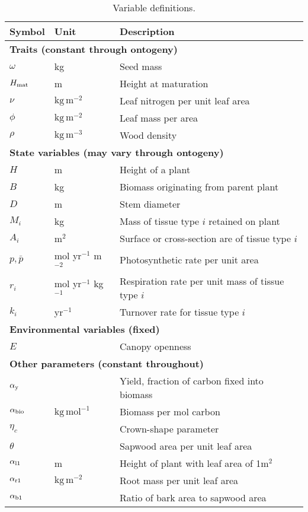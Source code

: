 \documentclass[9pt,twocolumn,twoside]{pnas-new}
\begin{document}
\begin{table}[!hb]
 \caption{Variable definitions.}
\centering
\begin{tabular}{p{0.5cm}p{1.75cm}p{5cm}}
\toprule
Symbol & Unit & Description \\
\midrule
\multicolumn{3}{l}{\textbf{Traits (constant through ontogeny)}}\\
$\omega$ & kg & Seed mass  \\
$H_{{\rm mat}}$ & m & Height at maturation\\
$\nu$ & $\mathrm{kg}\,\mathrm{m}^{-2}$ & Leaf nitrogen per unit leaf area  \\
$\phi$ & $\mathrm{kg}\,\mathrm{m}^{-2}$ & Leaf mass per area \\
$\rho$ & $\mathrm{kg}\,\mathrm{m}^{-3}$ & Wood density \\
\multicolumn{3}{l}{\textbf{State variables (may vary through ontogeny)}} \\
$H$ & m & Height of a plant\\
$B$ & kg & Biomass originating from parent plant\\
$D$ & m & Stem diameter\\
$M_i$ & kg & Mass of tissue type $i$ retained on plant \\
$A_i$ & m$^2$ & Surface or cross-section are of tissue type $i$\\
$p,\bar{p}$ & mol yr$^{-1}$ m$^{-2}$ & Photosynthetic rate per unit area \\
$r_i$ & mol yr$^{-1}$ kg$^{-1}$  & Respiration rate per unit mass of tissue type $i$ \\
$k_i$ & yr$^{-1}$ & Turnover rate for tissue type $i$ \\
\multicolumn{3}{l}{\textbf{Environmental variables (fixed)}} \\
$E$ & & Canopy openness\\
\multicolumn{3}{l}{\textbf{Other parameters (constant throughout)}} \\
$\alpha_{\rm y}$ &  & Yield, fraction of carbon fixed into biomass\\
$\alpha_{\rm bio}$  & $\mathrm{kg}\,\mathrm{mol}^{-1}$ & Biomass per mol carbon \\
$\eta_c$ & & Crown-shape parameter\\
$\theta$ &  & Sapwood area per unit leaf area\\
$\alpha_{\rm l1}$ & m & Height of plant with leaf area of 1m$^2$ \\
$\alpha_{\rm r1}$ & $\mathrm{kg}\,\mathrm{m}^{-2}$ & Root mass per unit leaf area \\
$\alpha_{\rm b1}$ &  & Ratio of bark area to sapwood area\\
\bottomrule
\end{tabular}
\label{tab:definitions}
\end{table}
\end{document}
